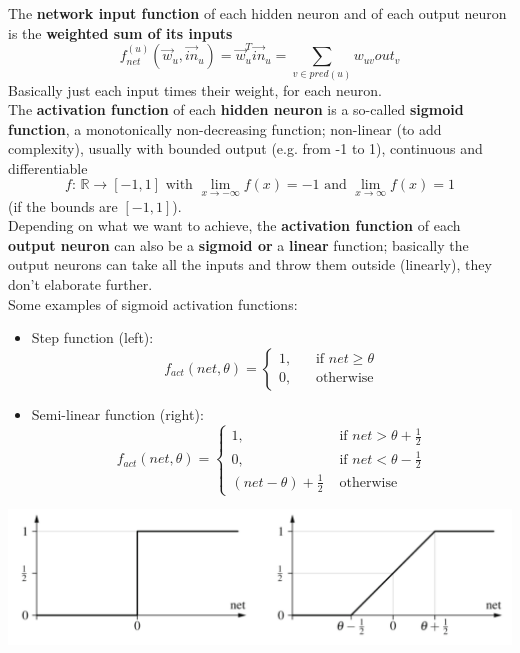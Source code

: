 \documentclass[11pt]{article}
\begin{document}
		\newpage
		
		The \textbf{network input function} of each hidden neuron and of each output neuron is the \textbf{weighted sum of its inputs}
		$$ f_{net}^{(u)} \left(\vec{w}_u, \vec{in}_u\right) = \vec{w}_u^T \vec{in}_u = \sum_{v \in pred(u)} w_{uv} out_v $$
		Basically just each input times their weight, for each neuron.\\
		
		
		The \textbf{activation function} of each \textbf{hidden neuron} is a so-called \textbf{sigmoid function}, a monotonically non-decreasing function; non-linear (to add complexity), usually with bounded output (e.g. from -1 to 1), continuous and differentiable
		$$ f: \, \mathbb{R} \rightarrow [-1, 1] \text{ with } \lim_{x \rightarrow - \infty} f(x) = -1 \text{ and } \lim_{x \rightarrow \infty} f(x) = 1 $$
		(if the bounds are $[-1, 1]$).\\
		
		Depending on what we want to achieve, the \textbf{activation function} of each \textbf{output neuron} can also be a \textbf{sigmoid or} a \textbf{linear} function; basically the output neurons can take all the inputs and throw them outside (linearly), they don't elaborate further.\\
		
		Some examples of sigmoid activation functions:
		\begin{itemize}
			\item Step function (left):
			$$ f_{act} (net, \theta) = \begin{cases}
				1, \;\; & \text{ if } net \geq \theta \\
				0, & \text{ otherwise}
			\end{cases} $$
			\item Semi-linear function (right):
				$$ f_{act} (net, \theta) = \begin{cases}
				1, \;\; & \text{ if } net > \theta + \frac{1}{2} \\
				0, & \text{ if } net < \theta - \frac{1}{2} \\
				(net - \theta) + \frac{1}{2} & \text{ otherwise}
			\end{cases} $$
		\end{itemize}
		\begin{center}
			\includegraphics[width=0.9\columnwidth]{img/NN/sigmoid1}
		\end{center}
		
\end{document}
